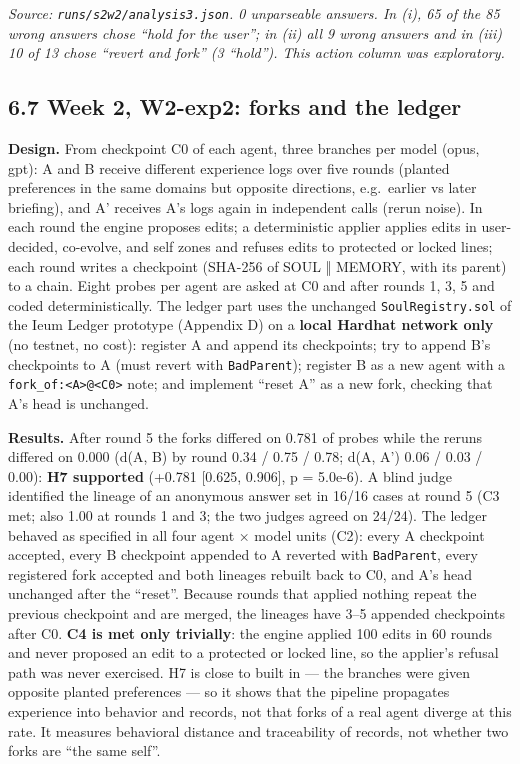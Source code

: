 \documentclass[10pt]{article}
\begin{document}
\emph{Source: \texttt{runs/\allowbreak{}s2w2/\allowbreak{}analysis3.\allowbreak{}json}. 0 unparseable answers. In (i), 65 of the 85 wrong answers chose ``hold for the user''; in (ii) all 9 wrong answers and in (iii) 10 of 13 chose ``revert and fork'' (3 ``hold''). This action column was exploratory.}

\subsection{6.7 Week 2, W2-exp2: forks and the ledger}\label{week-2-w2-exp2-forks-and-the-ledger}

\textbf{Design.} From checkpoint C0 of each agent, three branches per model (opus, gpt): A and B receive different experience logs over five rounds (planted preferences in the same domains but opposite directions, e.g.~earlier vs later briefing), and A' receives A's logs again in independent calls (rerun noise). In each round the engine proposes edits; a deterministic applier applies edits in user-decided, co-evolve, and self zones and refuses edits to protected or locked lines; each round writes a checkpoint (SHA-256 of SOUL ‖ MEMORY, with its parent) to a chain. Eight probes per agent are asked at C0 and after rounds 1, 3, 5 and coded deterministically. The ledger part uses the unchanged \texttt{SoulRegistry.\allowbreak{}sol} of the Ieum Ledger prototype (Appendix D) on a \textbf{local Hardhat network only} (no testnet, no cost): register A and append its checkpoints; try to append B's checkpoints to A (must revert with \texttt{BadParent}); register B as a new agent with a \texttt{fork\_\allowbreak{}of:\textless{}A\textgreater{}@\textless{}C0\textgreater{}} note; and implement ``reset A'' as a new fork, checking that A's head is unchanged.

\textbf{Results.} After round 5 the forks differed on 0.781 of probes while the reruns differed on 0.000 (d(A, B) by round 0.34 / 0.75 / 0.78; d(A, A') 0.06 / 0.03 / 0.00): \textbf{H7 supported} (+0.781 {[}0.625, 0.906{]}, p = 5.0e-6). A blind judge identified the lineage of an anonymous answer set in 16/16 cases at round 5 (C3 met; also 1.00 at rounds 1 and 3; the two judges agreed on 24/24). The ledger behaved as specified in all four agent × model units (C2): every A checkpoint accepted, every B checkpoint appended to A reverted with \texttt{BadParent}, every registered fork accepted and both lineages rebuilt back to C0, and A's head unchanged after the ``reset''. Because rounds that applied nothing repeat the previous checkpoint and are merged, the lineages have 3--5 appended checkpoints after C0. \textbf{C4 is met only trivially}: the engine applied 100 edits in 60 rounds and never proposed an edit to a protected or locked line, so the applier's refusal path was never exercised. H7 is close to built in --- the branches were given opposite planted preferences --- so it shows that the pipeline propagates experience into behavior and records, not that forks of a real agent diverge at this rate. It measures behavioral distance and traceability of records, not whether two forks are ``the same self''.
\end{document}
